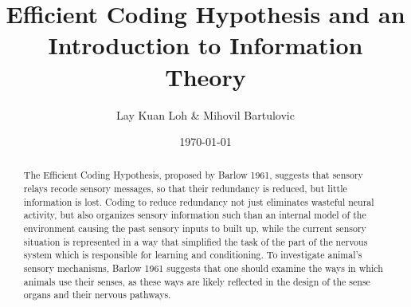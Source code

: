 \documentclass[twoside]{article}
\title{\vspace{-15mm}\fontsize{24pt}{10pt}\selectfont\textbf{Efficient Coding Hypothesis and an Introduction to Information Theory}} %
\author{Lay Kuan Loh \& Mihovil Bartulovic}
\date{\today}
\begin{document}
\maketitle %

\thispagestyle{fancy} %





\begin{abstract}

\noindent The Efficient Coding Hypothesis, proposed by Barlow 1961, suggests that sensory relays recode sensory messages, so that their redundancy is reduced, but little information is lost. Coding to reduce redundancy not just eliminates wasteful neural activity, but also organizes sensory information such than an internal model of the environment causing the past sensory inputs to built up, while the current sensory situation is represented in a way that simplified the task of the part of the nervous system which is responsible for learning and conditioning. To investigate animal's sensory mechanisms, Barlow 1961 suggests that one should examine the ways in which animals use their senses, as these ways are likely reflected in the design of the sense organs and their nervous pathways.

\end{abstract}









\end{document}
